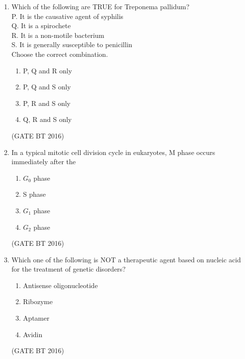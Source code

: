 \documentclass[journal,12pt,onecolumn]{IEEEtran}
\theoremstyle{remark}
\begin{document}
\begin{enumerate}
\item Which of the following are TRUE for Treponema pallidum?\\
    P. It is the causative agent of syphilis\\
    Q. It is a spirochete\\
    R. It is a non-motile bacterium\\
    S. It is generally susceptible to penicillin\\
Choose the correct combination.
\begin{multicols}{4}
\begin{enumerate}
\item  P, Q and R only
\item P, Q and S only	
\item P, R and S only	
\item Q, R and S only
\end{enumerate}
\end{multicols} \hfill(GATE BT 2016)  

\item In a typical mitotic cell division cycle in eukaryotes, M phase occurs immediately after the
\begin{multicols}{4}
\begin{enumerate}
\item $G_0$ phase	
\item S phase
\item $G_1$ phase	
\item $G_2$ phase
\end{enumerate}
\end{multicols} \hfill(GATE BT 2016)  

\item Which one of the following is NOT a therapeutic agent based on nucleic acid for the treatment of genetic disorders?
\begin{multicols}{2}
\begin{enumerate}
\item Antisense oligonucleotide	
\item Ribozyme
\item Aptamer
\item Avidin
\end{enumerate}
\end{multicols} \hfill(GATE BT 2016)   


\end{enumerate}
\end{document}
